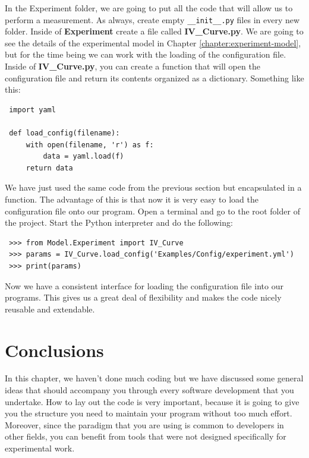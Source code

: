 In the Experiment folder, we are going to put all the code that will allow us to perform a measurement. As always, create empty \texttt{\_\_init\_\_.py} files in every new folder. Inside of \textbf{Experiment} create a file called \textbf{IV_Curve.py}. We are going to see the details of the experimental model in Chapter \ref{chapter:experiment-model}, but for the time being we can work with the loading of the configuration file. Inside of \textbf{IV_Curve.py}, you can create a function that will open the configuration file and return its contents organized as a dictionary. Something like this:

\begin{verbatim}
 import yaml
 
 def load_config(filename):
     with open(filename, 'r') as f:
         data = yaml.load(f)
     return data
\end{verbatim}

We have just used the same code from the previous section but encapsulated in a function. The advantage of this is that now it is very easy to load the configuration file onto our program. Open a terminal and go to the root folder of the project. Start the Python interpreter and do the following:

\begin{verbatim}
 >>> from Model.Experiment import IV_Curve
 >>> params = IV_Curve.load_config('Examples/Config/experiment.yml')
 >>> print(params)
\end{verbatim}

Now we have a consistent interface for loading the configuration file into our programs. This gives us a great deal of flexibility and makes the code nicely reusable and extendable. 


\section{Conclusions}\label{section:layout-conclusions}
In this chapter, we haven't done much coding but we have discussed some general ideas that should accompany you through every software
development that you undertake. How to lay out the code is very important, because it is going to give you the structure you need to
maintain your program without too much effort. Moreover, since the paradigm that you are using is common to developers in other fields, you can benefit from tools that were not designed specifically for experimental work.

